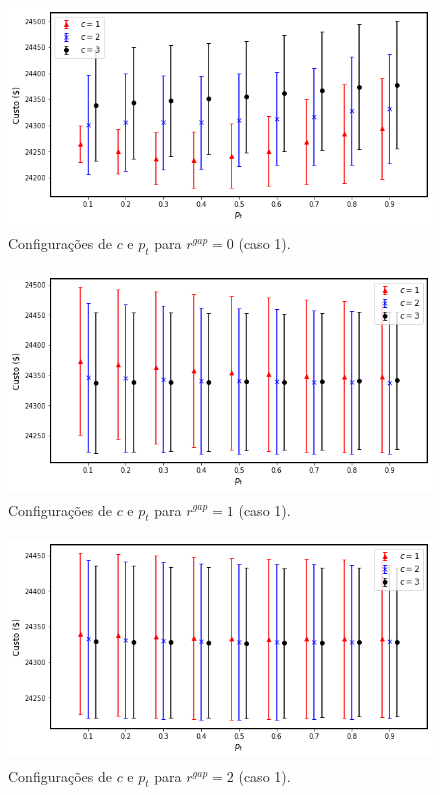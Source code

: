 \documentclass[
	12pt,				%
	openany,			%
	twoside,			%
	a4paper,			%
	chapter=TITLE,		%
	section=Title,		%
	subsection=Title,	%
	subsubsection=Title,%
	english,			%
	french,				%
	spanish,			%
	brazil			%
	]{abntex2}
\begin{document}
\begin{ERRATA}
\begin{apendicesenv}
\begin{figure}[h!]
    \caption{\label{rgap0_13}Configurações de $c$ e $p_t$ para $r^{gap}=0$ (caso 1).}
    \centering
    \includegraphics[width=120mm, height=60mm]{images/rgap0_13.png}
   
\end{figure}

\begin{figure} [h!]
    \centering
    \caption{\label{rgap1_13}Configurações de $c$ e $p_t$ para $r^{gap}=1$ (caso 1).}
    \includegraphics[width=120mm, height=60mm]{images/rgap1_13.png}
\end{figure}


\begin{figure}[h!]
    \caption{\label{rgap2_13}Configurações de $c$ e $p_t$ para $r^{gap}=2$ (caso 1).}
    \centering
    \includegraphics[width=120mm, height=60mm]{images/rgap2_13.png}


\end{figure}
\end{apendicesenv}
\end{ERRATA}
\end{document}
